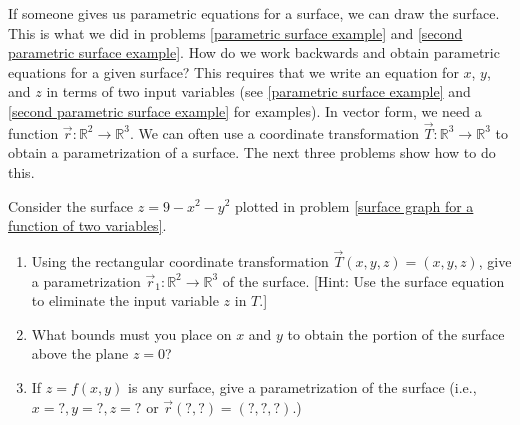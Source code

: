 If someone gives us parametric equations for a surface, we can draw the surface. This is what we did in problems \ref{parametric surface example} and \ref{second parametric surface example}. 
How do we work backwards and obtain parametric equations for a given surface?
This requires that we write an equation for $x$, $y$, and $z$ in terms of two input variables (see \ref{parametric surface example} and \ref{second parametric surface example} for examples). 
In vector form, we need a function $\vec r\colon \mathbb{R}^2\to\mathbb{R}^3$. 
We can often use a coordinate transformation $\vec T\colon \mathbb{R}^3\to\mathbb{R}^3$ to obtain a parametrization of a surface. 
The next three problems show how to do this.   
\begin{problem}\label{3d parametric plot}
%
%
 Consider the surface $z=9-x^2-y^2$ plotted in problem \ref{surface graph for a function of two variables}.
\begin{enumerate}
 \item 
Using the rectangular coordinate transformation $\vec T(x,y,z)=(x,y,z)$, give a parametrization $\vec r_1\colon \mathbb{R}^2\to\mathbb{R}^3$ of the surface. 
[Hint: Use the surface equation to eliminate the input variable $z$ in $T$.]
 \item What bounds must you place on $x$ and $y$ to obtain the portion of the surface above the plane $z=0$?
 \item If $z=f(x,y)$ is any surface, give a parametrization of the surface (i.e., $x=?, y=?, z=?$ or $\vec r (?,?)=(?,?,?)$.)
\end{enumerate}

\end{problem}
